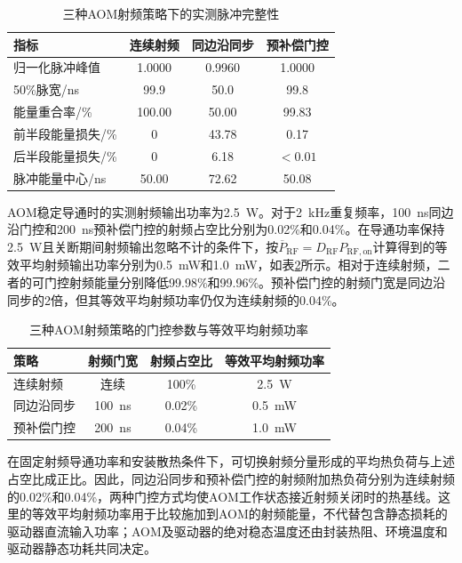 \begin{table}[htbp]
  \centering
  \caption{三种AOM射频策略下的实测脉冲完整性}
  \label{tab:chap3_gating_experimental_summary}
  \begin{tabular}{lccc}
    \toprule
    指标 & 连续射频 & 同边沿同步 & 预补偿门控 \\
    \midrule
    归一化脉冲峰值 & 1.0000 & 0.9960 & 1.0000 \\
    50\%脉宽/ns & 99.9 & 50.0 & 99.8 \\
    能量重合率/\% & 100.00 & 50.00 & 99.83 \\
    前半段能量损失/\% & 0 & 43.78 & 0.17 \\
    后半段能量损失/\% & 0 & 6.18 & $<0.01$ \\
    脉冲能量中心/ns & 50.00 & 72.62 & 50.08 \\
    \bottomrule
  \end{tabular}
\end{table}

AOM稳定导通时的实测射频输出功率为2.5~W。对于2~kHz重复频率，100~ns同边沿门控和200~ns预补偿门控的射频占空比分别为0.02\%和0.04\%。在导通功率保持2.5~W且关断期间射频输出忽略不计的条件下，按$\overline{P}_{\mathrm{RF}}=D_{\mathrm{RF}}P_{\mathrm{RF,on}}$计算得到的等效平均射频输出功率分别为0.5~mW和1.0~mW，如表\ref{tab:chap3_gating_rf_power}所示。相对于连续射频，二者的可门控射频能量分别降低99.98\%和99.96\%。预补偿门控的射频门宽是同边沿同步的2倍，但其等效平均射频功率仍仅为连续射频的0.04\%。

\begin{table}[htbp]
  \centering
  \caption{三种AOM射频策略的门控参数与等效平均射频功率}
  \label{tab:chap3_gating_rf_power}
  \begin{tabular}{lccc}
    \toprule
    策略 & 射频门宽 & 射频占空比 & 等效平均射频功率 \\
    \midrule
    连续射频 & 连续 & 100\% & 2.5~W \\
    同边沿同步 & 100~ns & 0.02\% & 0.5~mW \\
    预补偿门控 & 200~ns & 0.04\% & 1.0~mW \\
    \bottomrule
  \end{tabular}
\end{table}

在固定射频导通功率和安装散热条件下，可切换射频分量形成的平均热负荷与上述占空比成正比。因此，同边沿同步和预补偿门控的射频附加热负荷分别为连续射频的0.02\%和0.04\%，两种门控方式均使AOM工作状态接近射频关闭时的热基线。这里的等效平均射频功率用于比较施加到AOM的射频能量，不代替包含静态损耗的驱动器直流输入功率；AOM及驱动器的绝对稳态温度还由封装热阻、环境温度和驱动器静态功耗共同决定。

